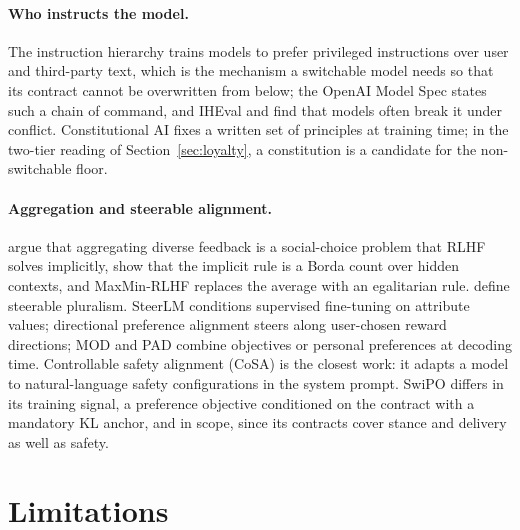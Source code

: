 \documentclass[letterpaper]{article} %
\begin{document}
\paragraph{Who instructs the model.}
The instruction hierarchy \cite{wallace2024instruction} trains models to prefer privileged instructions over user and third-party text, which is the mechanism a switchable model needs so that its contract cannot be overwritten from below; the OpenAI Model Spec \cite{openai2025modelspec} states such a chain of command, and IHEval \cite{zhang2025iheval} and \citet{geng2025control} find that models often break it under conflict. Constitutional AI \cite{bai2022constitutional} fixes a written set of principles at training time; in the two-tier reading of Section~\ref{sec:loyalty}, a constitution is a candidate for the non-switchable floor.

\paragraph{Aggregation and steerable alignment.}
\citet{conitzer2024social} argue that aggregating diverse feedback is a social-choice problem that RLHF solves implicitly, \citet{siththaranjan2024distributional} show that the implicit rule is a Borda count over hidden contexts, and MaxMin-RLHF \cite{chakraborty2024maxmin} replaces the average with an egalitarian rule. \citet{sorensen2024roadmap} define steerable pluralism. SteerLM \cite{dong2023steerlm} conditions supervised fine-tuning on attribute values; directional preference alignment \cite{wang-etal-2024-arithmetic} steers along user-chosen reward directions; MOD \cite{shi2024decodingtime} and PAD \cite{chen2025pad} combine objectives or personal preferences at decoding time. Controllable safety alignment (CoSA) \cite{zhang2025cosa} is the closest work: it adapts a model to natural-language safety configurations in the system prompt. SwiPO differs in its training signal, a preference objective conditioned on the contract with a mandatory KL anchor, and in scope, since its contracts cover stance and delivery as well as safety.

\section{Limitations}
\end{document}
